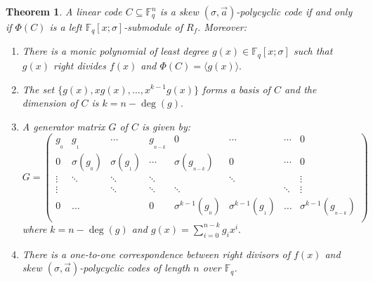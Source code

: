 \documentclass[12pt,paper]{article}
\theoremstyle{plain}
\newtheorem{theorem}{Theorem}[section] %
\newcommand{\Fq}{\mathbb{F}_{q}}
\begin{document}
 \begin{theorem}\label{T2.3}
 A linear code  $ C\subseteq \Fq^{n} $ is a skew $(\sigma,\vec{a})$-polycyclic   code if and only if $\Phi(C)$  is a left $\Fq[x;\sigma]$-submodule of $  R_f.$ Moreover:
 \begin{enumerate}
 \item There is a monic polynomial of least degree $ g(x)\in \Fq[x;\sigma] $ such that $ g(x) $  right divides $ f(x) $
 and $ \Phi(C)=\langle g(x)\rangle. $
 \item The set $ \{ g(x),x g(x),\ldots,x^{k-1}g(x)\} $ forms a basis of $ C $ and the dimension of $ C $ is $ k=n-\deg(g). $

 \item A generator matrix $ G $ of $ C $ is given by:
 \begin{equation}\label{eq10}
 G= \left(
 \begin{array}{cccccccc}
 g_{_0} &g_{_1} &\cdots&g_{_{n-k}}& 0 &\cdots &\cdots & 0\\
 0 & \sigma(g_{_0}) & \sigma(g_{_1}) &\cdots & \sigma(g_{_{n-k}}) & 0 &\cdots & 0\\
 \vdots &\ddots &\ddots &\ddots & &\ddots & &\vdots\\
 \vdots & &\ddots &\ddots &\ddots & &\ddots &\vdots\\
 0 &\ldots & &0 & \sigma^{k-1}(g_{_0}) & \sigma^{k-1}(g_{_1}) &\ldots & \sigma^{k-1}(g_{_{n-k}})\\
 \end{array}
 \right) 
 \end{equation}
 where $k=n-\deg(g) $ and $ g(x)= \displaystyle\sum_{i=0}^{n-k} g_ix^i. $
\item There is a one-to-one correspondence between  right divisors of $f(x)$ and skew $(\sigma,\vec{a})$-polycyclic   codes of length $n$ over $\Fq$.
\end{enumerate}
 \end{theorem}
\end{document}
